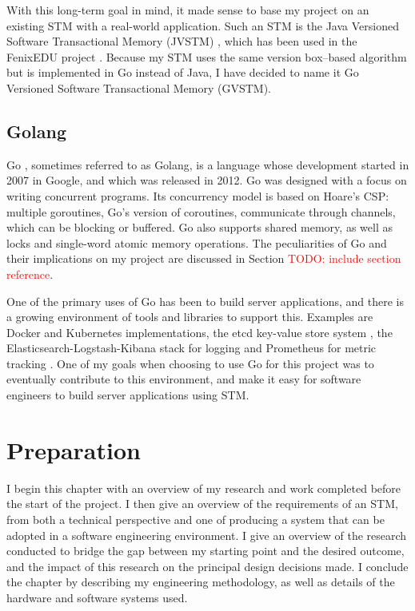\documentclass[12pt,a4paper,oneside,openright]{report}
\newcommand{\todo}[1]{\textcolor{red}{TODO: #1}}
\begin{document}
With this long-term goal in mind, it made sense to base my project on
an existing STM with a real-world application. Such an STM is the Java
Versioned Software Transactional Memory (JVSTM) \cite{jvstm}, which
has been used in the FenixEDU project
\cite{carvalho2008versioned}. Because my STM uses the same version
box--based algorithm \cite{VBox} but is implemented in Go instead of
Java, I have decided to name it Go Versioned Software Transactional
Memory (GVSTM).

\section{Golang}
\label{sec:intro:golang}

Go \cite{Go}, sometimes referred to as Golang, is a language whose
development started in 2007 in Google, and which was released in
2012. Go was designed with a focus on writing concurrent programs. Its
concurrency model is based on Hoare's CSP: multiple goroutines, Go's
version of coroutines, communicate through channels, which can be
blocking or buffered. Go also supports shared memory, as well as locks
and single-word atomic memory operations. The peculiarities of Go and
their implications on my project are discussed in Section
\todo{include section reference}.

One of the primary uses of Go has been to build server applications,
and there is a growing environment of tools and libraries to support
this. Examples are Docker and Kubernetes implementations, the etcd
key-value store system \cite{etcd}, the Elasticsearch-Logstash-Kibana
stack for logging \cite{ELK} and Prometheus for metric tracking
\cite{Prom}. One of my goals when choosing to use Go for this project
was to eventually contribute to this environment, and make it easy for
software engineers to build server applications using STM.


\chapter{Preparation}

I begin this chapter with an overview of my research and work
completed before the start of the project. I then give an overview of
the requirements of an STM, from both a technical perspective and one
of producing a system that can be adopted in a software engineering
environment. I give an overview of the research conducted to bridge
the gap between my starting point and the desired outcome, and the
impact of this research on the principal design decisions made. I
conclude the chapter by describing my engineering methodology, as well
as details of the hardware and software systems used.
\end{document}
